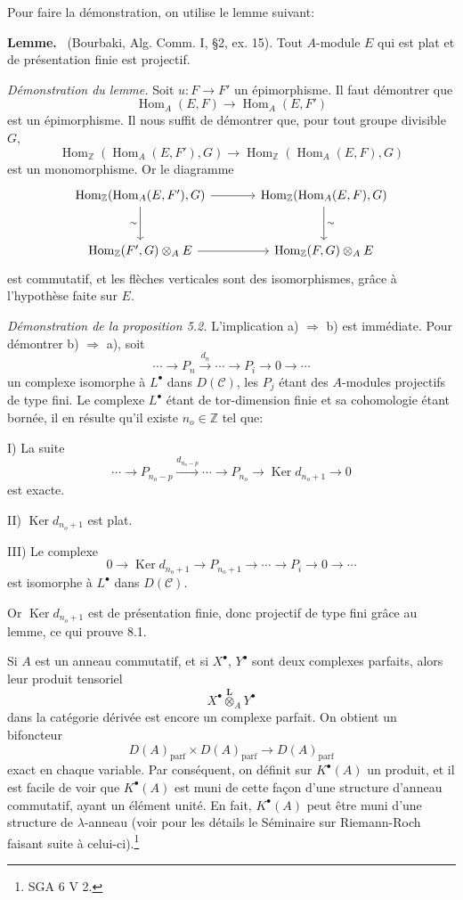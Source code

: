\documentclass[11pt]{article}
\newenvironment{statement}[1]{\par\medskip\noindent\textbf{#1.}\ }{\par\medskip}
\DeclareMathOperator{\Hom}{Hom}
\providecommand{\Ker}{\operatorname{Ker}}
\providecommand{\parf}{\mathrm{parf}}
\providecommand{\Hom}{\operatorname{Hom}}
\providecommand{\cC}{\mathcal C}
\providecommand{\Ker}{\operatorname{Ker}}
\providecommand{\Ker}{\operatorname{Ker}}
\providecommand{\cC}{\mathcal C}
\providecommand{\parf}{\mathrm{parf}}
\providecommand{\Hom}{\operatorname{Hom}}
\begin{document}
Pour faire la démonstration, on utilise le lemme suivant:

\begin{statement}{Lemme}
(Bourbaki, Alg. Comm. I, §2, ex. 15). Tout $A$-module $E$ qui est plat et de présentation finie est projectif.
\end{statement}

\emph{Démonstration du lemme.} Soit $u:F\to F'$ un épimorphisme. Il faut démontrer que
\[
\Hom_A(E,F)\longrightarrow\Hom_A(E,F')
\]
est un épimorphisme. Il nous suffit de démontrer que, pour tout groupe divisible $G$,
\[
\Hom_{\mathbb Z}(\Hom_A(E,F'),G)\longrightarrow
\Hom_{\mathbb Z}(\Hom_A(E,F),G)
\]
est un monomorphisme. Or le diagramme
\[
\begin{tikzcd}[column sep=large,row sep=large]
\Hom_{\mathbb Z}(\Hom_A(E,F'),G)
 \arrow[r]\arrow[d,"\sim"']&
\Hom_{\mathbb Z}(\Hom_A(E,F),G)\arrow[d,"\sim"]\\
\Hom_{\mathbb Z}(F',G)\otimes_A E
 \arrow[r]&
\Hom_{\mathbb Z}(F,G)\otimes_A E
\end{tikzcd}
\]
est commutatif, et les flèches verticales sont des isomorphismes, grâce à l'hypothèse faite sur $E$.

\emph{Démonstration de la proposition 5.2.} L'implication a) $\Rightarrow$ b) est immédiate. Pour démontrer b) $\Rightarrow$ a), soit
\[
\cdots\longrightarrow P_n\xrightarrow{d_n}\cdots\longrightarrow P_i\longrightarrow 0\longrightarrow\cdots
\]
un complexe isomorphe à $L^\bullet$ dans $D(\cC)$, les $P_j$ étant des $A$-modules projectifs de type fini. Le complexe $L^\bullet$ étant de tor-dimension finie et sa cohomologie étant bornée, il en résulte qu'il existe $n_o\in\mathbb Z$ tel que:

I) La suite
\[
\cdots\longrightarrow P_{n_o-p}\xrightarrow{d_{n_o-p}}\cdots\longrightarrow
P_{n_o}\longrightarrow \Ker d_{n_o+1}\longrightarrow0
\]
est exacte.

II) $\Ker d_{n_o+1}$ est plat.

III) Le complexe
\[
0\longrightarrow \Ker d_{n_o+1}\longrightarrow P_{n_o+1}\longrightarrow\cdots\longrightarrow P_i\longrightarrow0\longrightarrow\cdots
\]
est isomorphe à $L^\bullet$ dans $D(\cC)$.

Or $\Ker d_{n_o+1}$ est de présentation finie, donc projectif de type fini grâce au lemme, ce qui prouve 8.1.

Si $A$ est un anneau commutatif, et si $X^\bullet$, $Y^\bullet$ sont deux complexes parfaits, alors leur produit tensoriel
\[
X^\bullet\overset{\mathbf L}{\otimes}_A Y^\bullet
\]
dans la catégorie dérivée est encore un complexe parfait. On obtient un bifoncteur
\[
D(A)_{\parf}\times D(A)_{\parf}\longrightarrow D(A)_{\parf}
\]
exact en chaque variable. Par conséquent, on définit sur $K^{\bullet}(A)$ un produit, et il est facile de voir que $K^{\bullet}(A)$ est muni de cette façon d'une structure d'anneau commutatif, ayant un élément unité. En fait, $K^{\bullet}(A)$ peut être muni d'une structure de $\lambda$-anneau (voir pour les détails le Séminaire sur Riemann-Roch faisant suite à celui-ci).\footnote{SGA 6 V 2.}
\end{document}
